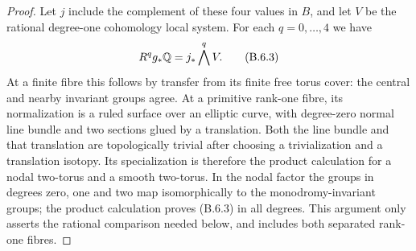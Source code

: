 \begin{proof}
Let $j$ include the complement of these four values in $B$, and let
$V$ be the rational degree-one cohomology local system. For each
$q=0,\ldots,4$ we have
\[
 R^q g_*\mathbb Q=j_*\bigwedge^qV.
 \tag{B.6.3}
\]
At a finite fibre this follows by transfer from its finite free torus
cover: the central and nearby invariant groups agree. At a primitive
rank-one fibre, its normalization is a ruled surface over an elliptic
curve, with degree-zero normal line bundle and two sections glued by
a translation. Both the line bundle and that translation are
topologically trivial after choosing a trivialization and a translation
isotopy. Its specialization is therefore the product calculation for
a nodal two-torus and a smooth two-torus. In the nodal factor the
groups in degrees zero, one and two map isomorphically to the
monodromy-invariant groups; the product calculation proves (B.6.3)
in all degrees. This argument only asserts the rational comparison
needed below, and includes both separated rank-one fibres.


\end{proof}
